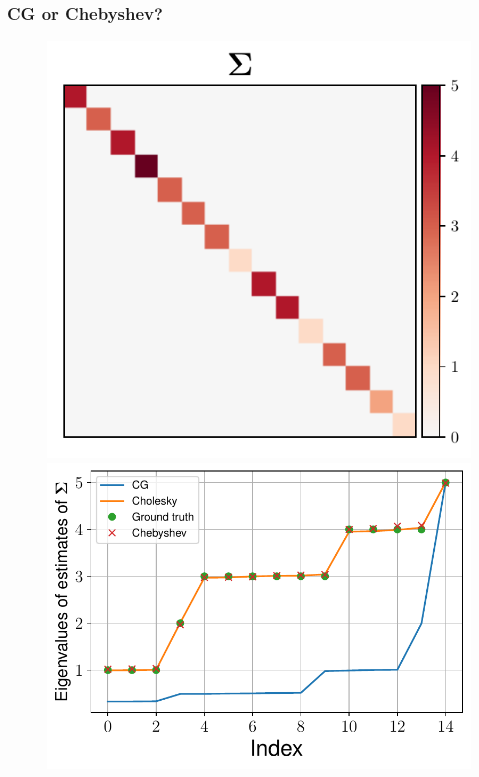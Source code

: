 \documentclass[aspectratio=169]{beamer}
\begin{document}
\begin{frame}
\frametitle{CG or Chebyshev?}
\begin{figure}
    \centering
    \mbox{{\includegraphics[scale=0.4]{src/images/simu1_ex2_A.pdf}}}
    \mbox{{\includegraphics[scale=0.3]{src/images/simu1_ex2_eigvals_A.pdf}}}
\end{figure}
\begin{figure}
    \centering

\end{figure}
\end{frame}
\end{document}
